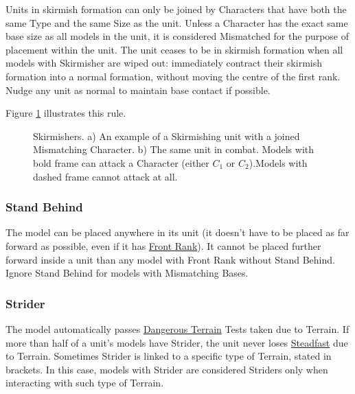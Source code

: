 Units in skirmish formation can only be joined by Characters that have both the same Type and the same Size as the unit. Unless a Character has the exact same base size as all \rnf{} models in the unit, it is considered Mismatched for the purpose of placement within the unit. The unit ceases to be in skirmish formation when all \rnf{} models with Skirmisher are wiped out: immediately contract their skirmish formation into a normal formation, without moving the centre of the first rank. Nudge any unit as normal to maintain base contact if possible.

Figure \ref{figure/skirmisher} illustrates this rule.

\newcommand{\figSkirmiA}{a)}
\newcommand{\figSkirmiB}{b)}
\newcommand{\figSkirmiDist}{\normalfontsize \SI{12.5}{\milli\meter}}
\newcommand{\figSkirmiCharOne}{$C_{1}$}
\newcommand{\figSkirmiCharTwo}{$C_{2}$}

\begin{figure}[!htbp]
\centering
\def\svgwidth{\textwidth}

\caption{Skirmishers.\captionpar
a) An example of a Skirmishing unit with a joined Mismatching Character.\captionpar
b) The same unit in combat. Models with bold frame can attack a Character (either $C_{1}$ or $C_{2}$).\newline Models with dashed frame cannot attack at all.}
\label{figure/skirmisher}
\end{figure}

\subsubsection{Stand Behind}
\label{stand_behind}

The model can be placed anywhere in its unit (it doesn't have to be placed as far forward as possible, even if it has \hyperref[front_rank]{Front Rank}). It cannot be placed further forward inside a unit than any model with Front Rank without Stand Behind. Ignore Stand Behind for models with Mismatching Bases.

\subsubsection{Strider}
\label{strider}

The model automatically passes \hyperref[dangerous_terrain]{Dangerous Terrain} Tests taken due to Terrain. If more than half of a unit's models have Strider, the unit never loses \hyperref[steadfast]{Steadfast} due to Terrain. Sometimes Strider is linked to a specific type of Terrain, stated in brackets. In this case, models with Strider are considered Striders only when interacting with such type of Terrain.

